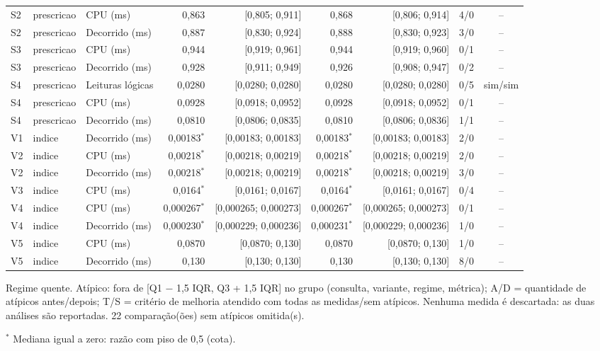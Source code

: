 {\begin{tabular}{lllrrrrrc}
S2 & prescricao & CPU (ms) & 0,863 & [0,805; 0,911] & 0,868 & [0,806; 0,914] & 4/0 & -- \\
S2 & prescricao & Decorrido (ms) & 0,887 & [0,830; 0,924] & 0,888 & [0,830; 0,923] & 3/0 & -- \\
S3 & prescricao & CPU (ms) & 0,944 & [0,919; 0,961] & 0,944 & [0,919; 0,960] & 0/1 & -- \\
S3 & prescricao & Decorrido (ms) & 0,928 & [0,911; 0,949] & 0,926 & [0,908; 0,947] & 0/2 & -- \\
S4 & prescricao & Leituras lógicas & 0,0280 & [0,0280; 0,0280] & 0,0280 & [0,0280; 0,0280] & 0/5 & sim/sim \\
S4 & prescricao & CPU (ms) & 0,0928 & [0,0918; 0,0952] & 0,0928 & [0,0918; 0,0952] & 0/1 & -- \\
S4 & prescricao & Decorrido (ms) & 0,0810 & [0,0806; 0,0835] & 0,0810 & [0,0806; 0,0836] & 1/1 & -- \\
V1 & indice & Decorrido (ms) & 0,00183$^{*}$ & [0,00183; 0,00183] & 0,00183$^{*}$ & [0,00183; 0,00183] & 2/0 & -- \\
V2 & indice & CPU (ms) & 0,00218$^{*}$ & [0,00218; 0,00219] & 0,00218$^{*}$ & [0,00218; 0,00219] & 2/0 & -- \\
V2 & indice & Decorrido (ms) & 0,00218$^{*}$ & [0,00218; 0,00219] & 0,00218$^{*}$ & [0,00218; 0,00219] & 3/0 & -- \\
V3 & indice & CPU (ms) & 0,0164$^{*}$ & [0,0161; 0,0167] & 0,0164$^{*}$ & [0,0161; 0,0167] & 0/4 & -- \\
V4 & indice & CPU (ms) & 0,000267$^{*}$ & [0,000265; 0,000273] & 0,000267$^{*}$ & [0,000265; 0,000273] & 0/1 & -- \\
V4 & indice & Decorrido (ms) & 0,000230$^{*}$ & [0,000229; 0,000236] & 0,000231$^{*}$ & [0,000229; 0,000236] & 1/0 & -- \\
V5 & indice & CPU (ms) & 0,0870 & [0,0870; 0,130] & 0,0870 & [0,0870; 0,130] & 1/0 & -- \\
V5 & indice & Decorrido (ms) & 0,130 & [0,130; 0,130] & 0,130 & [0,130; 0,130] & 8/0 & -- \\
\bottomrule
\end{tabular}\par
\vspace{3pt}
\begin{minipage}{\linewidth}\footnotesize
Regime quente. Atípico: fora de [Q1 $-$ 1,5 IQR, Q3 + 1,5 IQR] no grupo (consulta, variante, regime, métrica); A/D = quantidade de atípicos antes/depois; T/S = critério de melhoria atendido com todas as medidas/sem atípicos. Nenhuma medida é descartada: as duas análises são reportadas. 22 comparação(ões) sem atípicos omitida(s).\par
$^{*}$ Mediana igual a zero: razão com piso de 0,5 (cota).
\end{minipage}
}
